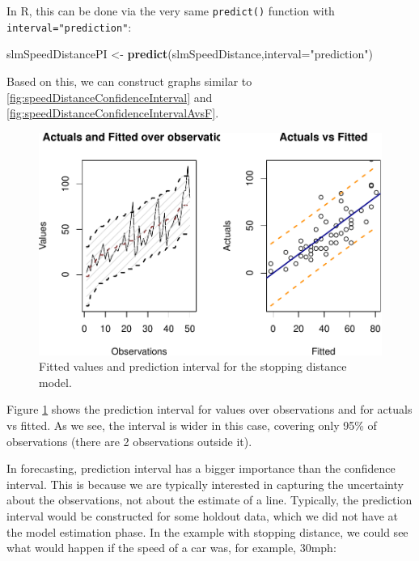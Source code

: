 \documentclass[
]{book}
\newenvironment{Shaded}{\begin{snugshade}}{\end{snugshade}}
\newcommand{\DataTypeTok}[1]{\textcolor[rgb]{0.13,0.29,0.53}{#1}}
\newcommand{\KeywordTok}[1]{\textcolor[rgb]{0.13,0.29,0.53}{\textbf{#1}}}
\newcommand{\NormalTok}[1]{#1}
\newcommand{\StringTok}[1]{\textcolor[rgb]{0.31,0.60,0.02}{#1}}
\theoremstyle{definition}
\theoremstyle{definition}
\theoremstyle{definition}
\theoremstyle{definition}
\theoremstyle{remark}
\begin{document}
In R, this can be done via the very same \texttt{predict()} function with \texttt{interval="prediction"}:

\begin{Shaded}
\begin{Highlighting}[]
\NormalTok{slmSpeedDistancePI \textless{}{-}}\StringTok{ }\KeywordTok{predict}\NormalTok{(slmSpeedDistance,}\DataTypeTok{interval=}\StringTok{"prediction"}\NormalTok{)}
\end{Highlighting}
\end{Shaded}

Based on this, we can construct graphs similar to \ref{fig:speedDistanceConfidenceInterval} and \ref{fig:speedDistanceConfidenceIntervalAvsF}.

\begin{figure}
\centering
\includegraphics{Svetunkov---Statistics-for-Business-Analytics_files/figure-latex/speedDistancePI-1.pdf}
\caption{\label{fig:speedDistancePI}Fitted values and prediction interval for the stopping distance model.}
\end{figure}

Figure \ref{fig:speedDistancePI} shows the prediction interval for values over observations and for actuals vs fitted. As we see, the interval is wider in this case, covering only 95\% of observations (there are 2 observations outside it).

In forecasting, prediction interval has a bigger importance than the confidence interval. This is because we are typically interested in capturing the uncertainty about the observations, not about the estimate of a line. Typically, the prediction interval would be constructed for some holdout data, which we did not have at the model estimation phase. In the example with stopping distance, we could see what would happen if the speed of a car was, for example, 30mph:
\end{document}
